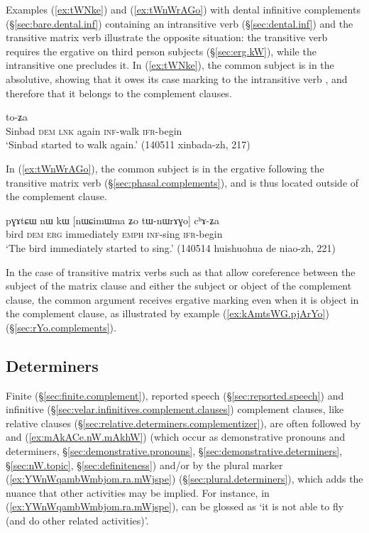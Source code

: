 Examples (\ref{ex:tWNke}) and (\ref{ex:tWnWrAGo}) with dental infinitive complements (§\ref{sec:bare.dental.inf}) containing an intransitive verb (§\ref{sec:dental.inf}) and the transitive matrix verb  illustrate the opposite situation: the transitive verb requires the ergative on third person subjects (§\ref{sec:erg.kW}), while the intransitive one precludes it. In (\ref{ex:tWNke}), the common subject is in the absolutive, showing that it owes its case marking to the intransitive verb , and therefore that it belongs to the complement clauses.

\begin{exe}
\ex \label{ex:tWNke}
 to-ʑa \\
Sinbad \textsc{dem} \textsc{lnk} again  \textsc{inf}-walk \textsc{ifr}-begin \\
\glt `Sinbad started to walk again.' (140511 xinbada-zh, 217)
\end{exe}

In (\ref{ex:tWnWrAGo}), the common subject is in the ergative following the transitive matrix verb  (§\ref{sec:phasal.complements}), and is thus located outside of the complement clause.

\begin{exe}
\ex \label{ex:tWnWrAGo}
\gll pɣɤtɕɯ nɯ kɯ [nɯɕimɯma ʑo tɯ-nɯrɤɣo] cʰɤ-ʑa \\
bird \textsc{dem} \textsc{erg} immediately \textsc{emph} \textsc{inf}-sing \textsc{ifr}-begin \\
\glt `The bird immediately started to sing.' (140514 huishuohua de niao-zh, 221)
\end{exe}

In the case of transitive matrix verbs such as  that allow coreference between the subject of the matrix clause and either the subject or object of the complement clause, the common argument receives ergative marking even when it is object in the complement clause, as illustrated by example (\ref{ex:kAmtsWG.pjArYo}) (§\ref{sec:rYo.complements}).

\subsection{Determiners} \label{sec:complement.determiner}
Finite (§\ref{sec:finite.complement}), reported speech (§\ref{sec:reported.speech}) and infinitive (§\ref{sec:velar.infinitives.complement.clauses}) complement clauses, like relative clauses (§\ref{sec:relative.determiners.complementizer}), are often followed by  and  (\ref{ex:mAkACe.nW.mAkhW})  (which occur as  demonstrative pronouns and determiners, §\ref{sec:demonstrative.pronouns}, §\ref{sec:demonstrative.determiners}, §\ref{sec:nW.topic}, §\ref{sec:definiteness}) and/or by the plural marker  (\ref{ex:YWnWqambWmbjom.ra.mWjspe}) (§\ref{sec:plural.determiners}), which adds the nuance that other activities may be implied. For instance, in (\ref{ex:YWnWqambWmbjom.ra.mWjspe}),  can be glossed as `it is not able to fly (and do other related activities)'.

